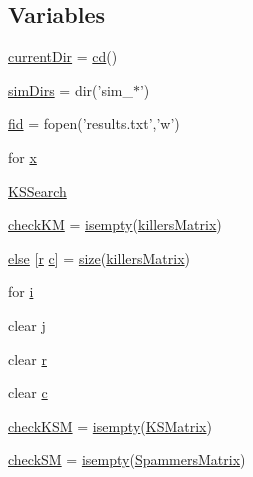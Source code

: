 \subsection*{Variables}
\begin{DoxyCompactItemize}
\item 
\hyperlink{a00031_af32eb97339f1e9d37b5540de2cbc79c9}{current\-Dir} = \hyperlink{a00068_a767271ad82d244871370a0f0e6a7f8a4}{cd}()
\item 
\hyperlink{a00031_aae5035eb84b89176ed5b06e136325eff}{sim\-Dirs} = dir('sim\-\_\-$\ast$')
\item 
\hyperlink{a00031_ae9011d40c6f13e68e6f07156e0da7c5d}{fid} = fopen('results.\-txt','w')
\item 
for \hyperlink{a00031_a7265972fe485274cfff77a9bb07b8fce}{x}
\item 
\hyperlink{a00031_af04f94b875b4f18fd2d6bd47d989f2b8}{K\-S\-Search}
\item 
\hyperlink{a00031_ac9c871eaf7455dc0d274ec20c5c69ac2}{check\-K\-M} = \hyperlink{a00025_ac10445404f4b83302522defb59e25ef7}{isempty}(\hyperlink{a00030_ab372fd9c8bb38cf3c78e995c0698b0ca}{killers\-Matrix})
\item 
\hyperlink{a00031_af5946383720aa572eb93e1e63afc23c2}{else} \mbox{[}\hyperlink{a00031_ac862e7284527eb913b1351c8bfb8e079}{r} \hyperlink{a00035_a6be92348ba85ef257b11d06209e1d7b6}{c}\mbox{]} = \hyperlink{a00062_ae113ea7f9e515a12ac4b5595c6faf61e}{size}(\hyperlink{a00030_ab372fd9c8bb38cf3c78e995c0698b0ca}{killers\-Matrix})
\item 
for \hyperlink{a00031_a66a219c6834c25b0073a6bb84e1e0117}{i}
\item 
clear \hyperlink{a00031_ad34e9c7e9ae69ae0b9f1866faed5e4ad}{j}
\item 
clear \hyperlink{a00031_ac862e7284527eb913b1351c8bfb8e079}{r}
\item 
clear \hyperlink{a00031_a8e54ca14679a1ce9245a3b7d55d95570}{c}
\item 
\hyperlink{a00031_a67eb148eecfd241148ce3711f058ac2b}{check\-K\-S\-M} = \hyperlink{a00025_ac10445404f4b83302522defb59e25ef7}{isempty}(\hyperlink{a00030_ab18f9eabd5f873bd17d226d786bc22df}{K\-S\-Matrix})
\item 
\hyperlink{a00031_ae80cf4c5bf659247b45bbad5d22dec52}{check\-S\-M} = \hyperlink{a00025_ac10445404f4b83302522defb59e25ef7}{isempty}(\hyperlink{a00030_a5bca8ffaecd726e70d088f2e00c9b4e0}{Spammers\-Matrix})
\end{DoxyCompactItemize}



